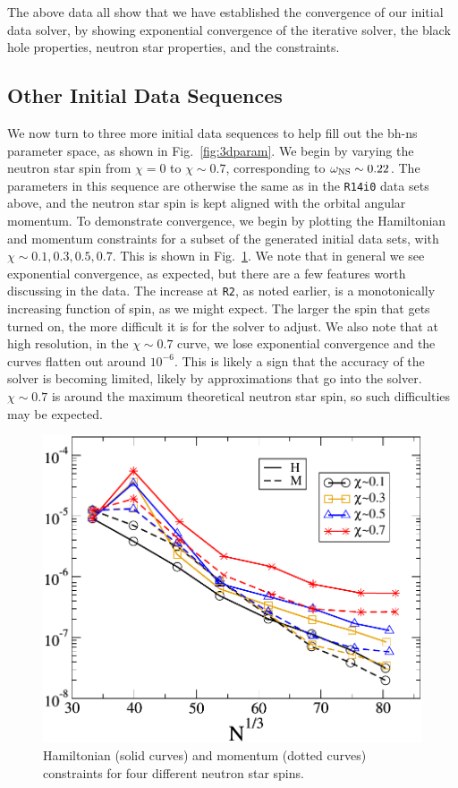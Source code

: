 The above data all show that we have established the convergence of
our initial data solver, by showing exponential convergence of the
iterative solver, the black hole properties, neutron star properties,
and the constraints.

\subsection{Other Initial Data Sequences}
We now turn to three more initial data sequences to help fill out the
bh-ns parameter space, as shown in Fig.~\ref{fig:3dparam}. We begin by
varying the neutron star spin from $\chi=0$ to $\chi\sim0.7$,
corresponding to $\omega_{\rm NS}\sim0.22$. The parameters in this
sequence are otherwise the same as in the {\tt R14i0} data sets
above, and the neutron star spin is kept aligned with the orbital
angular momentum. To demonstrate convergence, we begin by plotting the
Hamiltonian and momentum constraints for a subset of the generated
initial data sets, with $\chi\sim{0.1,0.3,0.5,0.7}$. This is shown in
Fig.~\ref{fig:OmegaSeqHamMom}. We note that in general we see
exponential convergence, as expected, but there are a few features
worth discussing in the data. The increase at {\tt R2}, as noted
earlier, is a monotonically increasing function of spin, as we might
expect. The larger the spin that gets turned on, the more difficult it
is for the solver to adjust. We also note that at high resolution, in
the $\chi\sim 0.7$ curve, we lose exponential convergence and the
curves flatten out around $10^{-6}$. This is likely a sign that the accuracy of the
solver is becoming limited, likely by approximations that go into the
solver. $\chi\sim 0.7$ is around the maximum theoretical neutron star
spin, so such difficulties may be expected.

\begin{figure}
\includegraphics[width=0.95\columnwidth]{chap4/OmegaSeqHamMom}
\caption[Constraints for the $\chi_{\rm NS}$ sequence.]{\label{fig:OmegaSeqHamMom} Hamiltonian (solid curves) and
momentum (dotted curves) constraints for four different neutron star spins.}
\end{figure}

